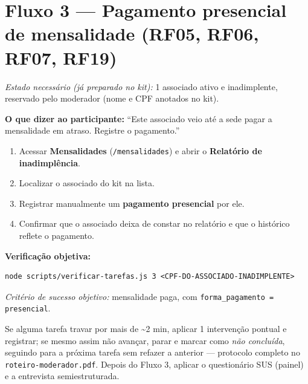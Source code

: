\documentclass[11pt,a4paper]{article}
\newcommand{\dizer}[1]{%
  \noindent\colorbox{lightbg}{%
    \begin{minipage}{0.95\linewidth}
    \vspace{1mm}
    \textbf{O que dizer ao participante:} ``#1''
    \vspace{1mm}
    \end{minipage}%
  }\vspace{3mm}
}
\newcommand{\criterio}[1]{%
  \noindent\textit{Critério de sucesso objetivo:} #1
}
\newcommand{\estado}[1]{%
  \noindent\textit{Estado necessário (já preparado no kit):} #1
  \vspace{2mm}
}
\begin{document}
\section*{Fluxo 3 --- Pagamento presencial de mensalidade (RF05, RF06, RF07, RF19)}

\estado{1 associado ativo e inadimplente, reservado pelo moderador (nome e CPF anotados no kit).}

\dizer{Este associado veio até a sede pagar a mensalidade em atraso. Registre o pagamento.}

\begin{enumerate}[leftmargin=6mm]
  \item Acessar \textbf{Mensalidades} (\texttt{/mensalidades}) e abrir o \textbf{Relatório de
    inadimplência}.
  \item Localizar o associado do kit na lista.
  \item Registrar manualmente um \textbf{pagamento presencial} por ele.
  \item Confirmar que o associado deixa de constar no relatório e que o histórico reflete o
    pagamento.
\end{enumerate}

\textbf{Verificação objetiva:}
\begin{verbatim}
node scripts/verificar-tarefas.js 3 <CPF-DO-ASSOCIADO-INADIMPLENTE>
\end{verbatim}
\criterio{mensalidade paga, com \texttt{forma\_pagamento = presencial}.}

\vfill
\noindent\footnotesize Se alguma tarefa travar por mais de \textasciitilde2 min, aplicar 1
intervenção pontual e registrar; se mesmo assim não avançar, parar e marcar como \textit{não
concluída}, seguindo para a próxima tarefa sem refazer a anterior --- protocolo completo no
\texttt{roteiro-moderador.pdf}. Depois do Fluxo 3, aplicar o questionário SUS (painel) e a
entrevista semiestruturada.
\end{document}
